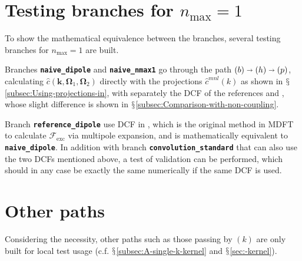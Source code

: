 \section{Testing branches for $n_{\max}=1$}

To show the mathematical equivalence between the branches, several
testing branches for $n_{\max}=1$ are built.

Branches \texttt{\textbf{naive\_dipole}} and \texttt{\textbf{naive\_nmax1}}
go through the path $\left(b\right)\shortrightarrow\left(h\right)\shortrightarrow\left(p\right)$,
calculating $\hat{c}(\mathbf{k},\mathbf{\Omega}_{1},\mathbf{\Omega}_{2})$
directly with the projections $\hat{c}^{mnl}(k)$ as shown in $\mathsection$\ref{subsec:Using-projections-in},
with separately the \acs{DCF} of the references \citep{zhao_accurate_2013}
and \citep{puibasset_bridge_2012}, whose slight difference is shown
in $\mathsection$\ref{subsec:Comparison-with-non-coupling}. 

Branch \texttt{\textbf{reference\_dipole}} use \acs{DCF} in \citep{zhao_accurate_2013},
which is the original method in \acs{MDFT} to calculate $\mathcal{F}_{\mathrm{exc}}$
via multipole expansion, and is mathematically equivalent to \texttt{\textbf{naive\_dipole}}.
In addition with branch \texttt{\textbf{convolution\_standard}} that
can also use the two \acs{DCF}s mentioned above, a test of validation
can be performed, which should in any case be exactly the same numerically
if the same \acs{DCF} is used.

\section{Other paths}

Considering the necessity, other paths such as those passing by $\left(k\right)$
are only built for local test usage (c.f. $\mathsection$\ref{subsec:A-single-k-kernel}
and $\mathsection$\ref{sec:-kernel}).
